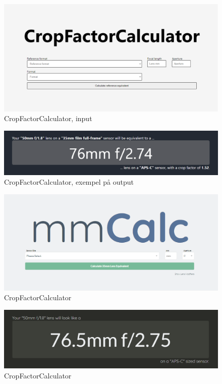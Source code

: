 \documentclass[11pt]{article}
\begin{document}
\begin{subfigures}

\begin{figure}[!htb]
\caption{CropFactorCalculator, input}
\includegraphics[width=\textwidth]{cfc-in}
\end{figure}

\begin{figure}[!htb]
\caption{CropFactorCalculator, exempel på output}
\includegraphics[width=\textwidth]{cfc-out}
\end{figure}

\end{subfigures}

\begin{subfigures}

\begin{figure}[!htb]
\caption{CropFactorCalculator}
\includegraphics[width=\textwidth]{mmcalc-in}
\end{figure}

\begin{figure}[!ht]
\caption{CropFactorCalculator}
\includegraphics[width=\textwidth]{mmcalc-out}
\end{figure}

\end{subfigures}
\end{document}

